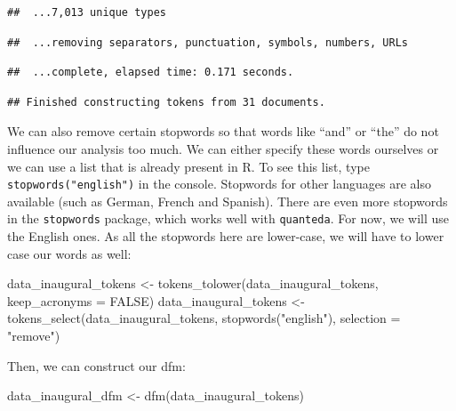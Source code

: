 \documentclass[
]{article}
\newenvironment{Shaded}{\begin{snugshade}}{\end{snugshade}}
\newcommand{\AttributeTok}[1]{\textcolor[rgb]{0.77,0.63,0.00}{#1}}
\newcommand{\ConstantTok}[1]{\textcolor[rgb]{0.00,0.00,0.00}{#1}}
\newcommand{\FunctionTok}[1]{\textcolor[rgb]{0.00,0.00,0.00}{#1}}
\newcommand{\NormalTok}[1]{#1}
\newcommand{\OtherTok}[1]{\textcolor[rgb]{0.56,0.35,0.01}{#1}}
\newcommand{\StringTok}[1]{\textcolor[rgb]{0.31,0.60,0.02}{#1}}
\begin{document}
\begin{verbatim}
##  ...7,013 unique types
\end{verbatim}

\begin{verbatim}
##  ...removing separators, punctuation, symbols, numbers, URLs
\end{verbatim}

\begin{verbatim}
##  ...complete, elapsed time: 0.171 seconds.
\end{verbatim}

\begin{verbatim}
## Finished constructing tokens from 31 documents.
\end{verbatim}

We can also remove certain stopwords so that words like ``and'' or ``the'' do not influence our analysis too much. We can either specify these words ourselves or we can use a list that is already present in R. To see this list, type \texttt{stopwords("english")} in the console. Stopwords for other languages are also available (such as German, French and Spanish). There are even more stopwords in the \texttt{stopwords} package, which works well with \texttt{quanteda}. For now, we will use the English ones. As all the stopwords here are lower-case, we will have to lower case our words as well:

\begin{Shaded}
\begin{Highlighting}[]
\NormalTok{data\_inaugural\_tokens }\OtherTok{\textless{}{-}} \FunctionTok{tokens\_tolower}\NormalTok{(data\_inaugural\_tokens, }\AttributeTok{keep\_acronyms =} \ConstantTok{FALSE}\NormalTok{)}
\NormalTok{data\_inaugural\_tokens }\OtherTok{\textless{}{-}} \FunctionTok{tokens\_select}\NormalTok{(data\_inaugural\_tokens, }\FunctionTok{stopwords}\NormalTok{(}\StringTok{"english"}\NormalTok{), }\AttributeTok{selection =} \StringTok{"remove"}\NormalTok{)}
\end{Highlighting}
\end{Shaded}

Then, we can construct our dfm:

\begin{Shaded}
\begin{Highlighting}[]
\NormalTok{data\_inaugural\_dfm }\OtherTok{\textless{}{-}} \FunctionTok{dfm}\NormalTok{(data\_inaugural\_tokens)}
\end{Highlighting}
\end{Shaded}
\end{document}
